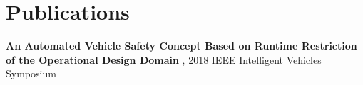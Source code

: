 \documentclass[]{deedy-resume-openfont}
\begin{document}
\begin{minipage}[t]{0.63\textwidth}

\section{Publications}
\textbf{An Automated Vehicle Safety Concept Based on Runtime Restriction of the Operational Design Domain} , 2018 IEEE Intelligent Vehicles Symposium


\sectionsep








\end{minipage} 
\end{document}
